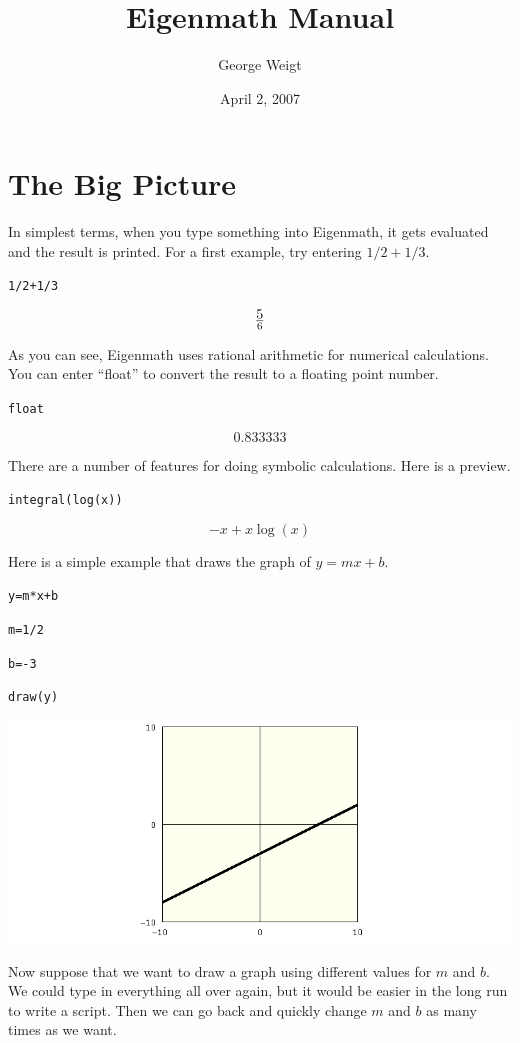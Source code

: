 \documentclass[12pt,openany]{report}
\title{Eigenmath Manual}
\author{George Weigt}
\date{April 2, 2007}
\begin{document}
\maketitle
\tableofcontents

\newpage

\chapter{The Big Picture}
In simplest terms, when you type something into Eigenmath,
it gets evaluated and the result is printed.
For a first example, try entering $1/2+1/3$.

\medskip
{\tt 1/2+1/3}

$$5\over6$$

\medskip
\noindent
As you can see, Eigenmath uses rational arithmetic for numerical calculations.
You can enter ``float'' to convert the result to a floating point number.

\medskip
{\tt float}

$$0.833333$$

\medskip
\noindent
There are a number of features for doing symbolic calculations.
Here is a preview.

\medskip
{\tt integral(log(x))}

$$-x+x\log(x)$$

\newpage

\noindent
Here is a simple example that draws the graph of $y=mx+b$.

\medskip
{\tt y=m*x+b}

{\tt m=1/2}

{\tt b=-3}

{\tt draw(y)}

\medskip
\noindent
\includegraphics[scale=0.5]{1.png}

\newpage

\noindent
Now suppose that we want to draw a graph
using different values for $m$ and $b$.
We could type in everything all over again, but it would be easier
in the long run to write a script.
Then we can go back and quickly change $m$ and $b$ as many times as we want.
\end{document}
